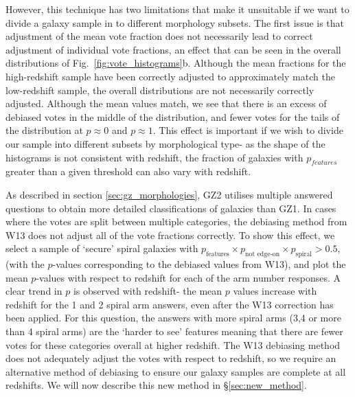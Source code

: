 \documentclass[useAMS,usenatbib]{mn2e}
\begin{document}
However, this technique has two limitations that make it unsuitable if we want to divide a galaxy sample in to different morphology subsets.  The first issue is that adjustment of the mean vote fraction does not necessarily lead to correct adjustment of individual vote fractions, an effect that can be seen in the overall distributions of Fig.~\ref{fig:vote_histograms}b.  Although the mean fractions for the high-redshift sample have been correctly adjusted to approximately match the low-redshift sample, the overall distributions are not necessarily correctly adjusted. Although the mean values match, we see that there is an excess of debiased votes in the middle of the distribution, and fewer votes for the tails of the distribution at $p \approx 0$ and $p \approx 1$. This effect is important if we wish to divide our sample into different subsets by morphological type- as the shape of the histograms is not consistent with redshift, the fraction of galaxies with $p_{features}$ greater than a given threshold can also vary with redshift.

As described in section \ref{sec:gz_morphologies}, GZ2 utilises multiple answered questions to obtain more detailed classifications of galaxies than GZ1. In cases where the votes are split between multiple categories, the debiasing method from W13 does not adjust all of the vote fractions correctly. To show this effect, we select a sample of `secure' spiral galaxies with $p_{\textrm{features}} \times p_{\textrm{not edge-on}} \times p_{\textrm{spiral}} > 0.5$, (with the $p$-values corresponding to the debiased values from W13), and plot the mean $p$-values with respect to redshift for each of the arm number responses. A clear trend in $p$ is observed with redshift- the mean $p$ values  increase with redshift for the 1 and 2 spiral arm answers, even after the W13 correction has been applied. For this question, the answers with more spiral arms (3,4 or more than 4 spiral arms) are the `harder to see' features meaning that there are fewer votes for these categories overall at higher redshift. The W13 debiasing method does not adequately adjust the votes with respect to redshift, so we require an alternative method of debiasing to ensure our galaxy samples are complete at all redshifts. We will now describe this new method in \S\ref{sec:new_method}.
\end{document}
